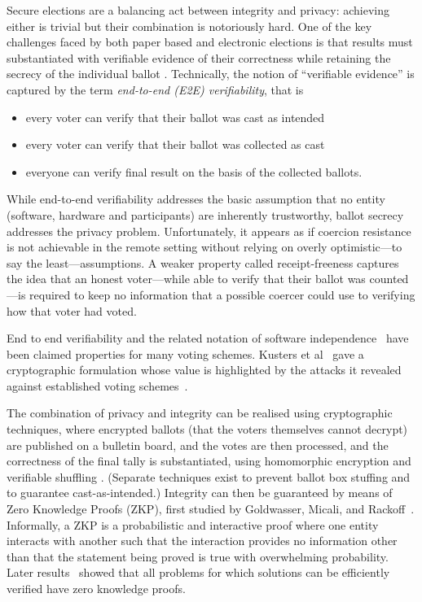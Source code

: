 \documentclass{llncs}
\begin{document}
Secure elections are a balancing act between integrity and privacy:
achieving either is trivial but their combination is notoriously hard.
One of the key challenges faced by both paper based and electronic
elections is that results must substantiated with
verifiable evidence of their correctness while retaining the secrecy
of the individual ballot \cite{Bernhard:2017:PES}.  Technically, the
notion of ``verifiable evidence'' is captured by the term 
\emph{end-to-end (E2E) verifiability}, that is
\begin{itemize}
  \item every voter can verify that their ballot was cast as
  intended
  \item every voter can verify that their ballot was collected as
  cast
  \item everyone can verify final result on the basis of the
  collected ballots.
\end{itemize}
While end-to-end verifiability addresses the basic assumption that
no entity (software, hardware and participants) are inherently
trustworthy, ballot secrecy addresses the privacy problem.
Unfortunately, it appears as if coercion resistance is not achievable  
in the remote setting without relying on overly optimistic---to say the least---assumptions.
A weaker property called receipt-freeness captures the idea that an honest 
voter---while able to verify that their ballot was counted---is required to keep 
no information that a possible coercer could use to verifying how that voter had voted.

End to end verifiability and the related notation of software independence~\cite{Rivest:2008:PTRS}
 have been claimed properties for many voting schemes.  Kusters et al~\cite{Kusters:2010:CCS} gave
 a cryptographic formulation whose value is highlighted by the attacks it revealed against established voting 
 schemes~\cite{Kusters:2012:SP}.

The combination of privacy and integrity can be realised using cryptographic techniques, where
encrypted ballots (that the voters themselves cannot decrypt) are
published on a bulletin board, and the votes are then processed, and
the correctness of the final tally is substantiated, using
homomorphic encryption \cite{Hirt:2000:ERF} and verifiable shuffling
\cite{Bayer:2012:EZK}. (Separate techniques exist to prevent ballot
box stuffing and to guarantee cast-as-intended.)
Integrity can then be guaranteed by means of Zero Knowledge Proofs
(ZKP),
first studied by Goldwasser, Micali, and Rackoff~\cite{Goldwasser:1985:STOC}.
Informally, a ZKP is a probabilistic and interactive proof where one
entity interacts with another such that the interaction provides
no information other than that the statement being proved is true with
overwhelming probability. 
Later results~\cite{Goldreich:1991:ACM}\cite{Ben-Or:1988:CRYPTO} showed that 
all problems for which solutions can be efficiently verified have zero knowledge
proofs.
\end{document}
